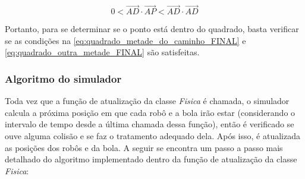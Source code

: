 \begin{alineas}[leftmargin=0pt, itemindent=20pt, labelwidth=15pt, labelsep=5pt, listparindent=1.25cm, align=left]
    \begin{equation}
        \label{eq:quadrado_outra_metade_FINAL}
        0 < \overrightarrow{AD} \cdot \overrightarrow{AP} < \overrightarrow{AD} \cdot \overrightarrow{AD}       
    \end{equation}

    Portanto, para se determinar se o ponto está dentro do quadrado, basta verificar se as condições na \autoref{eq:quadrado_metade_do_caminho_FINAL} e \autoref{eq:quadrado_outra_metade_FINAL} são satisfeitas.

\end{alineas}

\subsubsection{Algoritmo do simulador}

Toda vez que a função de atualização da classe \textit{Fisica} é chamada, o simulador calcula a próxima posição em que cada robô e a bola irão estar (considerando o intervalo de tempo desde a última chamada dessa função), então é verificado se ouve alguma colisão e se faz o tratamento adequado dela. Após isso, é atualizada as posições dos robôs e da bola. A seguir se encontra um passo a passo mais detalhado do algoritmo implementado dentro da função de atualização da classe \textit{Fisica}:

